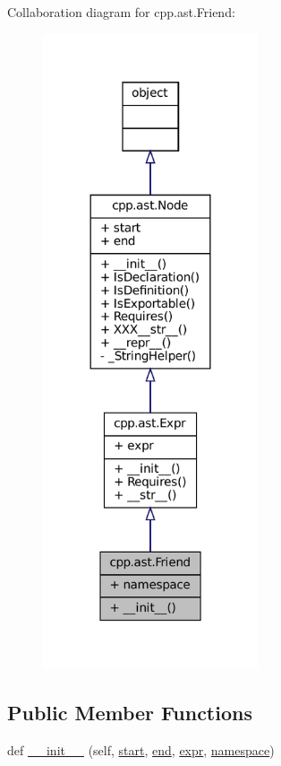 Collaboration diagram for cpp.\+ast.\+Friend\+:
\nopagebreak
\begin{figure}[H]
\begin{center}
\leavevmode
\includegraphics[width=180pt]{classcpp_1_1ast_1_1Friend__coll__graph}
\end{center}
\end{figure}
\subsection*{Public Member Functions}
\begin{DoxyCompactItemize}
\item 
def \hyperlink{classcpp_1_1ast_1_1Friend_a9fe245d0f14eaab85435e942a56de7e6}{\+\_\+\+\_\+init\+\_\+\+\_\+} (self, \hyperlink{classcpp_1_1ast_1_1Node_a7b2aa97e6a049bb1a93aea48c48f1f44}{start}, \hyperlink{classcpp_1_1ast_1_1Node_a3c5e5246ccf619df28eca02e29d69647}{end}, \hyperlink{classcpp_1_1ast_1_1Expr_a2f4e13fb0176f2616f8703103c806462}{expr}, \hyperlink{classcpp_1_1ast_1_1Friend_a076c68dddae9bd1e24d224d005538014}{namespace})
\end{DoxyCompactItemize}
